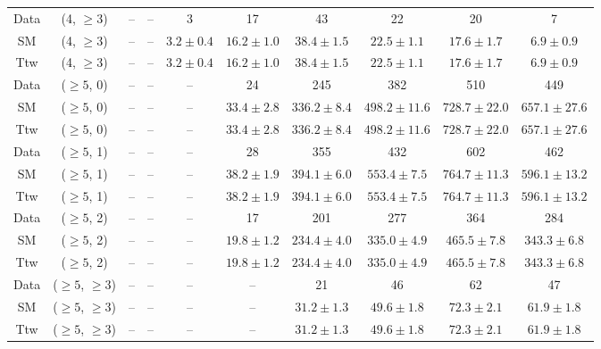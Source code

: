 \begin{table}[h!]
{\begin{tabular}{cccccccccc}
	Data & (4, $\ge3$) & -- & -- & 3 & 17 & 43 & 22 & 20 & 7 \\[0.5ex] 
	SM & (4, $\ge3$) & -- & -- & $3.2\pm 0.4$ & $16.2\pm 1.0$ & $38.4\pm 1.5$ & $22.5\pm 1.1$ & $17.6\pm 1.7$ & $6.9\pm 0.9$ \\[0.5ex] 
	Ttw & (4, $\ge3$) & -- & -- & $3.2\pm 0.4$ & $16.2\pm 1.0$ & $38.4\pm 1.5$ & $22.5\pm 1.1$ & $17.6\pm 1.7$ & $6.9\pm 0.9$ \\[0.5ex] 
	Data & ($\ge5$, 0) & -- & -- & -- & 24 & 245 & 382 & 510 & 449 \\[0.5ex] 
	SM & ($\ge5$, 0) & -- & -- & -- & $33.4\pm 2.8$ & $336.2\pm 8.4$ & $498.2\pm 11.6$ & $728.7\pm 22.0$ & $657.1\pm 27.6$ \\[0.5ex] 
	Ttw & ($\ge5$, 0) & -- & -- & -- & $33.4\pm 2.8$ & $336.2\pm 8.4$ & $498.2\pm 11.6$ & $728.7\pm 22.0$ & $657.1\pm 27.6$ \\[0.5ex] 
	Data & ($\ge5$, 1) & -- & -- & -- & 28 & 355 & 432 & 602 & 462 \\[0.5ex] 
	SM & ($\ge5$, 1) & -- & -- & -- & $38.2\pm 1.9$ & $394.1\pm 6.0$ & $553.4\pm 7.5$ & $764.7\pm 11.3$ & $596.1\pm 13.2$ \\[0.5ex] 
	Ttw & ($\ge5$, 1) & -- & -- & -- & $38.2\pm 1.9$ & $394.1\pm 6.0$ & $553.4\pm 7.5$ & $764.7\pm 11.3$ & $596.1\pm 13.2$ \\[0.5ex] 
	Data & ($\ge5$, 2) & -- & -- & -- & 17 & 201 & 277 & 364 & 284 \\[0.5ex] 
	SM & ($\ge5$, 2) & -- & -- & -- & $19.8\pm 1.2$ & $234.4\pm 4.0$ & $335.0\pm 4.9$ & $465.5\pm 7.8$ & $343.3\pm 6.8$ \\[0.5ex] 
	Ttw & ($\ge5$, 2) & -- & -- & -- & $19.8\pm 1.2$ & $234.4\pm 4.0$ & $335.0\pm 4.9$ & $465.5\pm 7.8$ & $343.3\pm 6.8$ \\[0.5ex] 
	Data & ($\ge5$, $\ge3$) & -- & -- & -- & -- & 21 & 46 & 62 & 47 \\[0.5ex] 
	SM & ($\ge5$, $\ge3$) & -- & -- & -- & -- & $31.2\pm 1.3$ & $49.6\pm 1.8$ & $72.3\pm 2.1$ & $61.9\pm 1.8$ \\[0.5ex] 
	Ttw & ($\ge5$, $\ge3$) & -- & -- & -- & -- & $31.2\pm 1.3$ & $49.6\pm 1.8$ & $72.3\pm 2.1$ & $61.9\pm 1.8$ \\[0.5ex] 
	\hline
	\hline
\end{tabular}}
\end{table}
